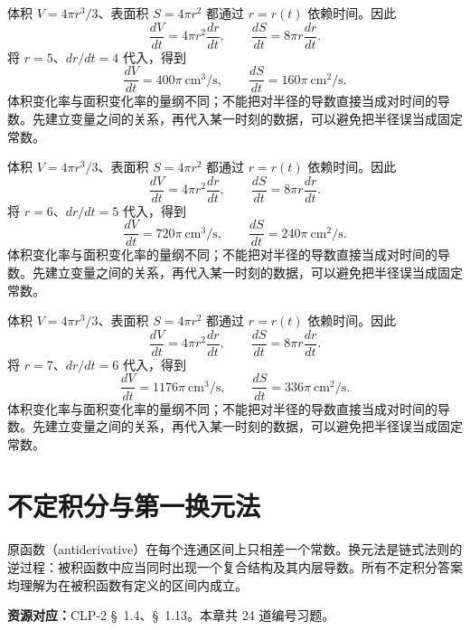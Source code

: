 \documentclass[UTF8,12pt,a4paper,fontset=fandol]{ctexart}
\begin{document}
\begin{solve}\label{ans:c11q23}
体积 $V=4\pi r^3/3$、表面积 $S=4\pi r^2$ 都通过 $r=r(t)$ 依赖时间。因此
\[
\frac{dV}{dt}=4\pi r^2\frac{dr}{dt},\qquad\frac{dS}{dt}=8\pi r\frac{dr}{dt}.
\]
将 $r=5$、$dr/dt=4$ 代入，得到
\[
\frac{dV}{dt}=400\pi\ \mathrm{cm}^3/\mathrm{s},\qquad\frac{dS}{dt}=160\pi\ \mathrm{cm}^2/\mathrm{s}.
\]
体积变化率与面积变化率的量纲不同；不能把对半径的导数直接当成对时间的导数。先建立变量之间的关系，再代入某一时刻的数据，可以避免把半径误当成固定常数。
\end{solve}

\begin{solve}\label{ans:c11q24}
体积 $V=4\pi r^3/3$、表面积 $S=4\pi r^2$ 都通过 $r=r(t)$ 依赖时间。因此
\[
\frac{dV}{dt}=4\pi r^2\frac{dr}{dt},\qquad\frac{dS}{dt}=8\pi r\frac{dr}{dt}.
\]
将 $r=6$、$dr/dt=5$ 代入，得到
\[
\frac{dV}{dt}=720\pi\ \mathrm{cm}^3/\mathrm{s},\qquad\frac{dS}{dt}=240\pi\ \mathrm{cm}^2/\mathrm{s}.
\]
体积变化率与面积变化率的量纲不同；不能把对半径的导数直接当成对时间的导数。先建立变量之间的关系，再代入某一时刻的数据，可以避免把半径误当成固定常数。
\end{solve}

\begin{solve}\label{ans:c11q25}
体积 $V=4\pi r^3/3$、表面积 $S=4\pi r^2$ 都通过 $r=r(t)$ 依赖时间。因此
\[
\frac{dV}{dt}=4\pi r^2\frac{dr}{dt},\qquad\frac{dS}{dt}=8\pi r\frac{dr}{dt}.
\]
将 $r=7$、$dr/dt=6$ 代入，得到
\[
\frac{dV}{dt}=1176\pi\ \mathrm{cm}^3/\mathrm{s},\qquad\frac{dS}{dt}=336\pi\ \mathrm{cm}^2/\mathrm{s}.
\]
体积变化率与面积变化率的量纲不同；不能把对半径的导数直接当成对时间的导数。先建立变量之间的关系，再代入某一时刻的数据，可以避免把半径误当成固定常数。
\end{solve}

\clearpage
\section{不定积分与第一换元法}\label{sec:ch12}
原函数（antiderivative）在每个连通区间上只相差一个常数。换元法是链式法则的逆过程：被积函数中应当同时出现一个复合结构及其内层导数。所有不定积分答案均理解为在被积函数有定义的区间内成立。

\textbf{资源对应：}CLP-2 \S~1.4、\S~1.13。本章共 24 道编号习题。
\end{document}
